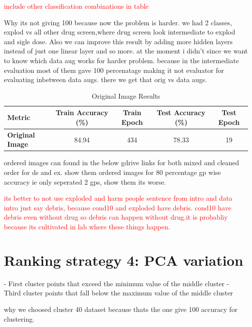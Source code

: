 \textcolor{red}{include other classification combinations in table}

Why its not giving 100 because now the problem is harder. we had 2 classes, explod vs all other drug screen,where drug screen look intermediate to explod and sigle dose.
Also we can improve this result by adding more hidden layers instead of just one linear layer and so more. at the moment i didn't since we want to know which data aug works for harder problem.
because in the intermediate evaluation  most of them gave 100 percenatage making it not  evaluator for evaluating inbetween data augs. there we get that orig vs data augs.

\begin{table}[h!]
  \centering
  \caption{Original Image Results}
  \label{tab:original_image_results}
  \begin{tabular}{lcccc}
  \toprule
  \textbf{Metric}         & \textbf{Train Accuracy (\%)} & \textbf{Train Epoch} & \textbf{Test Accuracy (\%)} & \textbf{Test Epoch} \\ \midrule
  \textbf{Original Image} & 84.94                        & 434                   & 78.33                        & 19                  \\ 
  \bottomrule
  \end{tabular}
\end{table}


ordered images can found in the below gdrive links for both mixed and cleaned order for ds and ex.
show them ordered images for 80 percentage gp wise accuracy ie only seperated 2 gps, show them its worse.

\textcolor{red}{its better to not use exploded and harm people sentence from intro and data intro just say debris, because cond10 and exploded have debris. cond10 
have debris even without drug so debris can happen without drug.it is probabliy because its cultivated in lab where these things happen.} 

\section{ Ranking strategy 4: PCA variation}

- First cluster points that exceed the minimum value of the middle cluster
- Third cluster points that fall below the maximum value of the middle cluster

why we choosed cluster 40 dataset because thats the one give 100 accuracy for clustering.

